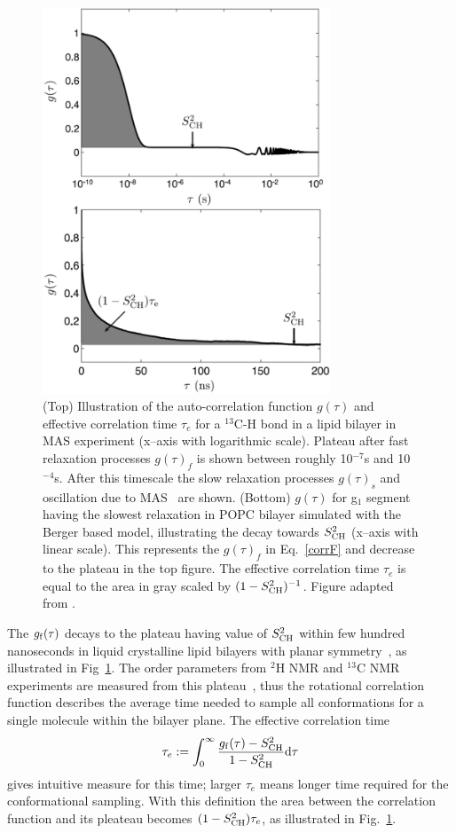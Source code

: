 \documentclass[aps,prl,superscriptaddress,twocolumn]{revtex4}
\begin{document}
\begin{figure}[]
  \includegraphics[width=8.6cm]{../Fig/correlationF.eps}
\newline
  \caption{\label{correlationF}
    (Top) Illustration of the auto-correlation function $g(\tau)$ and effective
    correlation time $\tau_e$ for a $^{13}$C-H bond in a lipid bilayer in MAS experiment (x--axis with logarithmic scale).
    Plateau after fast relaxation processes $g(\tau)_f$ is shown between roughly 10$^{-7}$s and 10$^{-4}$s.
    After this timescale the slow relaxation processes $g(\tau)_s$ and oscillation due to MAS~\cite{nowacka10} are shown.
    (Bottom) $g(\tau)$ for g$_1$ segment having the slowest relaxation in POPC bilayer simulated with the Berger based model,
    illustrating the decay towards $S^2_{{\rm CH}}$ (x--axis with linear scale). 
    This represents the $g(\tau)_f$ in Eq.~\ref{corrF} and decrease to the plateau in the top figure.
    The effective correlation time $\tau_e$ is equal to the area in gray scaled by $(1-S^2_{{\rm CH}})^{-1}$.
    Figure adapted from \cite{ferreira15}.
  } 
\end{figure}


The $g_{\rm{f}}(\tau)$ decays to the plateau having value of $S_{{\rm CH}}^2$ within few hundred nanoseconds 
in liquid crystalline lipid bilayers with planar symmetry~\cite{ferreira15}, as illustrated in Fig~\ref{correlationF}. 
The order parameters from $^2$H NMR and $^{13}$C NMR experiments are measured from this plateau~\cite{ferreira15},
thus the rotational correlation function describes the average time needed to sample all conformations for 
a single molecule within the bilayer plane. The effective correlation time~\cite{Lipari82}
\begin{equation}\label{effCTdef}
\tau_{e}:=\int_0^{\infty} \frac{g_{\rm{f}}(\tau)-S_{\rm{CH}}^2}{1-S_{\rm{CH}}^2} \mathrm{d}\tau
\end{equation} 
gives intuitive measure for this time; larger $\tau_e$ means longer time required for the conformational sampling.
With this definition the area between the correlation function and its pleateau becomes $(1-S_{\rm{CH}}^2)\tau_{e}$, 
as illustrated in Fig.~\ref{correlationF}.
\end{document}

